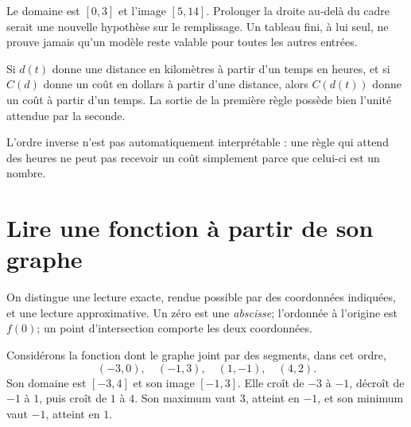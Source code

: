 Le domaine est \([0,3]\) et l'image \([5,14]\). Prolonger la droite au-delà du cadre serait une nouvelle hypothèse sur le remplissage. Un tableau fini, à lui seul, ne prouve jamais qu'un modèle reste valable pour toutes les autres entrées.

\begin{connectionbox}[title={La composition transporte aussi des unités}]
Si \(d(t)\) donne une distance en kilomètres à partir d'un temps en heures, et si \(C(d)\) donne un coût en dollars à partir d'une distance, alors \(C(d(t))\) donne un coût à partir d'un temps. La sortie de la première règle possède bien l'unité attendue par la seconde.
\end{connectionbox}

\begin{center}
\end{center}

L'ordre inverse n'est pas automatiquement interprétable : une règle qui attend des heures ne peut pas recevoir un coût simplement parce que celui-ci est un nombre.

\section{Lire une fonction à partir de son graphe}
\label{manual:section:03.07}

On distingue une lecture exacte, rendue possible par des coordonnées indiquées, et une lecture approximative. Un zéro est une \emph{abscisse}; l'ordonnée à l'origine est \(f(0)\); un point d'intersection comporte les deux coordonnées.

\begin{examplebox}[title={Lire des hauteurs et des intervalles}]
Considérons la fonction dont le graphe joint par des segments, dans cet ordre,
\[
(-3,0),\quad(-1,3),\quad(1,-1),\quad(4,2).
\]
Son domaine est \([-3,4]\) et son image \([-1,3]\). Elle croît de \(-3\) à \(-1\), décroît de \(-1\) à \(1\), puis croît de \(1\) à \(4\). Son maximum vaut \(3\), atteint en \(-1\), et son minimum vaut \(-1\), atteint en \(1\).
\end{examplebox}

